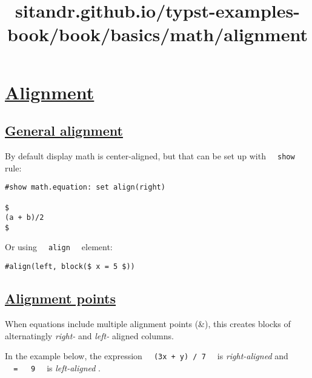 \pandocbounded{}


\title{sitandr.github.io/typst-examples-book/book/basics/math/alignment}

\section{\texorpdfstring{\hyperref[alignment]{Alignment}}{Alignment}}\label{alignment}

\subsection{\texorpdfstring{\hyperref[general-alignment]{General
alignment}}{General alignment}}\label{general-alignment}

By default display math is center-aligned, but that can be set up with
\texttt{\ }{\texttt{\ show\ }}\texttt{\ } rule:

\begin{verbatim}
#show math.equation: set align(right)

$
(a + b)/2
$
\end{verbatim}

\pandocbounded{}

Or using \texttt{\ }{\texttt{\ align\ }}\texttt{\ } element:

\begin{verbatim}
#align(left, block($ x = 5 $))
\end{verbatim}

\pandocbounded{}

\subsection{\texorpdfstring{\hyperref[alignment-points]{Alignment
points}}{Alignment points}}\label{alignment-points}

When equations include multiple alignment points (\&), this creates
blocks of alternatingly \emph{right-} and \emph{left-} aligned columns.

In the example below, the expression
\texttt{\ }{\texttt{\ (3x\ +\ y)\ /\ 7\ }}\texttt{\ } is
\emph{right-aligned} and
\texttt{\ }{\texttt{\ =\ }}\texttt{\ }{\texttt{\ 9\ }}\texttt{\ } is
\emph{left-aligned} .

